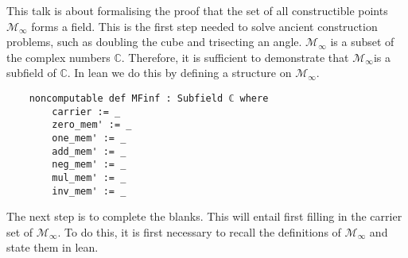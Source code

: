This talk is about formalising the proof that the set of all constructible points $\mathcal{M}_{\infty}$ forms a field. 
This is the first step needed to solve ancient construction problems, such as doubling the cube and trisecting an angle. 
$\mathcal{M}_{\infty}$ is a subset of the complex numbers $\mathbb{C}$. Therefore, it is sufficient to demonstrate that $\mathcal{M}_{\infty}$is a subfield of $\mathbb{C}$. 
In lean we do this by defining a structure on $\mathcal{M}_{\infty}$.

\begin{lstlisting}
    noncomputable def MFinf : Subfield ℂ where
        carrier := _
        zero_mem' := _
        one_mem' := _
        add_mem' := _
        neg_mem' := _
        mul_mem' := _
        inv_mem' := _
\end{lstlisting}

The next step is to complete the blanks. 
This will entail first filling in the carrier set of $\mathcal{M}_{\infty}$. To do this, it is first necessary to recall the definitions of $\mathcal{M}_{\infty}$ and state them in lean.